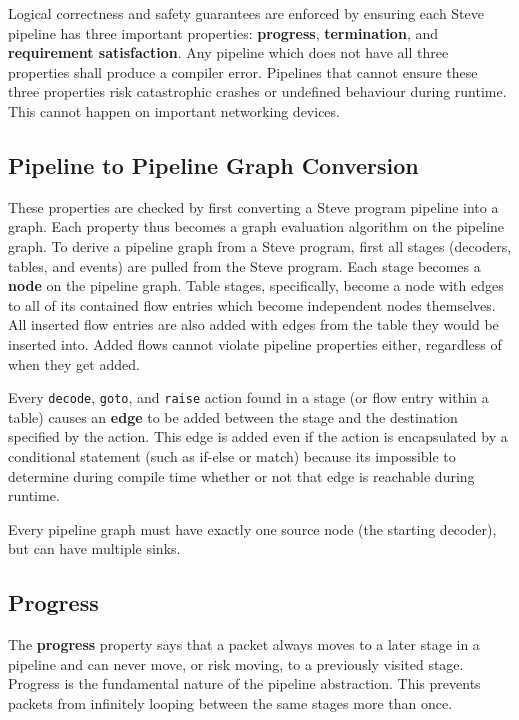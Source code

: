 Logical correctness and safety guarantees are enforced by ensuring each Steve pipeline has three important properties: \textbf{progress}, \textbf{termination}, and \textbf{requirement satisfaction}. Any pipeline which does not have all three properties shall produce a compiler error. Pipelines that cannot ensure these three properties risk catastrophic crashes or undefined behaviour during runtime. This cannot happen on important networking devices.

\subsection{Pipeline to Pipeline Graph Conversion} \label{pipeline_graph}

These properties are checked by first converting a Steve program pipeline into a graph. Each property thus becomes a graph evaluation algorithm on the pipeline graph. To derive a pipeline graph from a Steve program, first all stages (decoders, tables, and events) are pulled from the Steve program. Each stage becomes a \textbf{node} on the pipeline graph. Table stages, specifically, become a node with edges to all of its contained flow entries which become independent nodes themselves. All inserted flow entries are also added with edges from the table they would be inserted into. Added flows cannot violate pipeline properties either, regardless of when they get added.

Every \texttt{decode}, \texttt{goto}, and \texttt{raise} action found in a stage (or flow entry within a table) causes an \textbf{edge} to be added between the stage and the destination specified by the action. This edge is added even if the action is encapsulated by a conditional statement (such as if-else or match) because its impossible to determine during compile time whether or not that edge is reachable during runtime. 

Every pipeline graph must have exactly one source node (the starting decoder), but can have multiple sinks.

\subsection{Progress} \label{progress_guide}

The \textbf{progress} property says that a packet always moves to a later stage in a pipeline and can never move, or risk moving, to a previously visited stage. Progress is the fundamental nature of the pipeline abstraction. This prevents packets from infinitely looping between the same stages more than once. 

